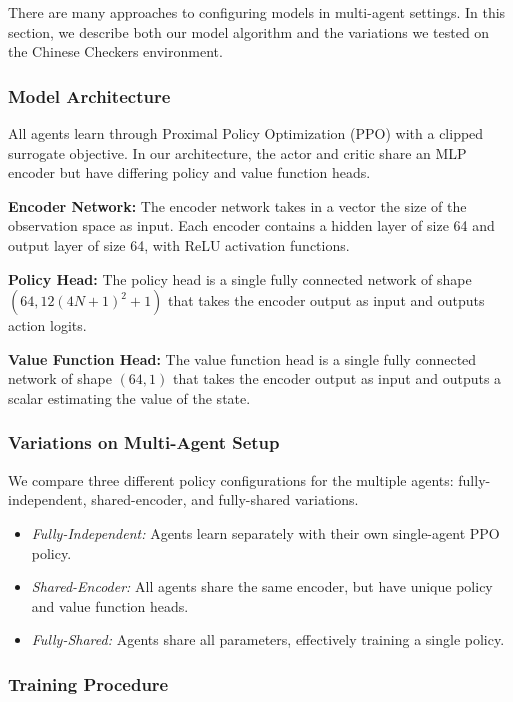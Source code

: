 \documentclass[12pt, a4paper, twocolumn]{article}
\begin{document}
There are many approaches to configuring models in multi-agent settings. In this section, we describe both our model algorithm and the variations we tested on the Chinese Checkers environment.

\subsubsection{Model Architecture}

All agents learn through Proximal Policy Optimization (PPO) with a clipped surrogate objective\cite{PPO}. In our architecture, the actor and critic share an MLP encoder but have differing policy and value function heads.

\textbf{Encoder Network:} The encoder network takes in a vector the size of the observation space as input. Each encoder contains a hidden layer of size 64 and output layer of size 64, with ReLU activation functions.

\textbf{Policy Head:} The policy head is a single fully connected network of shape $(64, 12(4N + 1)^2 + 1)$ that takes the encoder output as input and outputs action logits.

\textbf{Value Function Head:} The value function head is a single fully connected network of shape $(64, 1)$ that takes the encoder output as input and outputs a scalar estimating the value of the state.

\subsubsection{Variations on Multi-Agent Setup}

We compare three different policy configurations for the multiple agents: fully-independent, shared-encoder, and fully-shared variations.
\begin{itemize}
  \item \textit{Fully-Independent:} Agents learn separately with their own single-agent PPO policy. 
  \item \textit{Shared-Encoder:} All agents share the same encoder, but have unique policy and value function heads.
  \item \textit{Fully-Shared:} Agents share all parameters, effectively training a single policy.
\end{itemize}

\subsubsection{Training Procedure}
\end{document}
